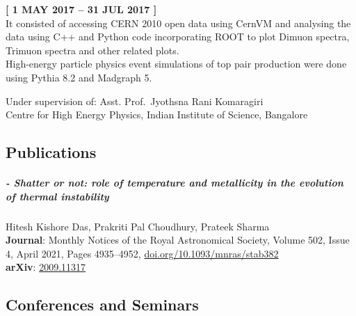 \documentclass[
  a4paper,
  11pt,
  oneside]{article}
\let\oldsubparagraph\subparagraph
\renewcommand{\subparagraph}[1]{\oldsubparagraph{#1}\mbox{}}
\begin{document}
\textbf{{[} 1 MAY 2017 -- 31 JUL 2017 {]}}\\
It consisted of accessing CERN 2010 open data using CernVM and analysing
the data using C++ and Python code incorporating ROOT to plot Dimuon
spectra, Trimuon spectra and other related plots.\\
High-energy particle physics event simulations of top pair production
were done using Pythia 8.2 and Madgraph 5.

Under supervision of: Asst. Prof.~Jyothsna Rani Komaragiri\\
Centre for High Energy Physics, Indian Institute of Science, Bangalore

\hypertarget{publications}{%
\subsection{Publications}\label{publications}}

\hypertarget{shatter-or-not-role-of-temperature-and-metallicity-in-the-evolution-of-thermal-instability}{%
\subparagraph{- Shatter or not: role of temperature and metallicity in
the evolution of thermal
instability}\label{shatter-or-not-role-of-temperature-and-metallicity-in-the-evolution-of-thermal-instability}}

Hitesh Kishore Das, Prakriti Pal Choudhury, Prateek Sharma\\
\textbf{Journal}: Monthly Notices of the Royal Astronomical Society,
Volume 502, Issue 4, April 2021, Pages 4935--4952,
\href{https://doi.org/10.1093/mnras/stab382}{doi.org/10.1093/mnras/stab382}\\
\textbf{arXiv}: \href{https://arxiv.org/abs/2009.11317}{2009.11317}

\hypertarget{conferences-and-seminars}{%
\subsection{Conferences and Seminars}\label{conferences-and-seminars}}
\end{document}
